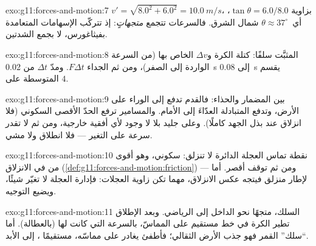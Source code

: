 \begin{solution}{exo:g11:forces-and-motion:7}
$v' = \sqrt{8.0^2 + 6.0^2} = \qty{10.0}{m/s}$، بزاوية $\tan\theta =
6.0/8.0$، أي\ $\theta \approx 37^\circ$ شمال الشرق. فالسرعات تتجمع
\emph{متجهاتٍ}: إذ تتركّب الإسهامات المتعامدة بفيثاغورس،
لا بجمع الشدتين.
\end{solution}

\begin{solution}{exo:g11:forces-and-motion:8}
المثبَّت سلفًا: كتلة الكرة و$\Delta v$ الخاص بها (من السرعة الواردة إلى
الصفر)، ومن ثم الجداء $F\Delta t$. ومدّ $\Delta t$ من
\qty{0.02}{s} إلى \qty{0.08}{s} يقسم  المتوسطة على $4$.
\end{solution}

\begin{solution}{exo:g11:forces-and-motion:9}
 بين المضمار والحذاء: فالقدم تدفع إلى الوراء
على الأرض، وتدفع  المتبادلة العدّاءَ
إلى الأمام. والمسامير ترفع الحدّ الأقصى  السكوني (فلا انزلاق عند بذل
الجهد كاملًا). وعلى جليد بلا  لا وجود لأي  أفقية خارجية، ومن ثم
لا تقدر سرعة  على التغير --- فلا انطلاق ولا مشي.
\end{solution}

\begin{solution}{exo:g11:forces-and-motion:10}
نقطة تماس العجلة الدائرة لا تنزلق:  سكوني،
وهو أقوى من  في الانزلاق
(\cref{def:g11:forces-and-motion:friction}) --- ومن ثم توقف أقصر. أما  لإطار منزلق فيتجه عكس الانزلاق، مهما تكن
زاوية العجلات: فإدارة العجلة لا تغيّر شيئًا، ويضيع التوجيه.
\end{solution}

\begin{solution}{exo:g11:forces-and-motion:11}
 السلك، متجهًا نحو الداخل إلى الرياضي. وبعد الإطلاق
تطير الكرة في خط مستقيم على المماسّ، بالسرعة
التي كانت لها (بالعطالة). أما ``سلك'' القمر فهو جذب الأرض
الثقالي؛ فأطفئ  يغادر على مماسّه، مستقيمًا
، إلى الأبد.
\end{solution}

